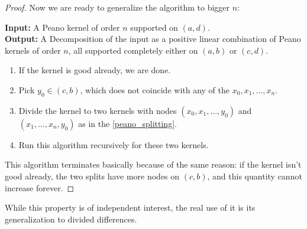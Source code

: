 \begin{proof}
	Now we are ready to generalize the algorithm to bigger $n$:

	\noindent \textbf{Input:} A Peano kernel of order $n$ supported on $(a, d)$. \\
	\noindent \textbf{Output:} A Decomposition of the input as a positive linear combination of Peano kernels of order $n$, all supported completely either on $(a, b)$ or $(c, d)$.
	\begin{enumerate}
		\item If the kernel is good already, we are done.
		\item Pick $y_{0} \in (c, b)$, which does not coincide with any of the $x_{0}, x_{1}, \ldots, x_{n}$.
		\item Divide the kernel to two kernels with nodes $(x_{0}, x_{1}, \ldots, y_{0})$ and $(x_{1}, \ldots, x_{n}, y_{0})$ as in the \ref{peano_splitting}.
		\item Run this algorithm recursively for these two kernels.
	\end{enumerate}
	This algorithm terminates basically because of the same reason: if the kernel isn't good already, the two splits have more nodes on $(c, b)$, and this quantity cannot increase forever.
\end{proof}

While this property is of independent interest, the real use of it is its generalization to divided differences.

